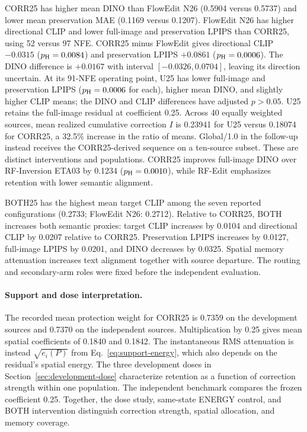 CORR25 has higher mean DINO than FlowEdit N26 (0.5904 versus 0.5737) and lower mean preservation MAE (0.1169 versus 0.1207). FlowEdit N26 has higher directional CLIP and lower full-image and preservation LPIPS than CORR25, using 52 versus 97 NFE. CORR25 minus FlowEdit gives directional CLIP $-0.0315$ ($p_{\rm H}=0.0084$) and preservation LPIPS $+0.0861$ ($p_{\rm H}=0.0006$). The DINO difference is $+0.0167$ with interval $[-0.0326,0.0704]$, leaving its direction uncertain. At its 91-NFE operating point, U25 has lower full-image and preservation LPIPS ($p_{\rm H}=0.0006$ for each), higher mean DINO, and slightly higher CLIP means; the DINO and CLIP differences have adjusted $p>0.05$. U25 retains the full-image residual at coefficient 0.25. Across 40 equally weighted sources, mean realized cumulative correction $I$ is 0.23941 for U25 versus 0.18074 for CORR25, a 32.5\% increase in the ratio of means. Global/1.0 in the follow-up instead receives the CORR25-derived sequence on a ten-source subset. These are distinct interventions and populations. CORR25 improves full-image DINO over RF-Inversion ETA03 by 0.1234 ($p_{\rm H}=0.0010$), while RF-Edit emphasizes retention with lower semantic alignment.

BOTH25 has the highest mean target CLIP among the seven reported configurations (0.2733; FlowEdit N26: 0.2712). Relative to CORR25, BOTH increases both semantic proxies: target CLIP increases by 0.0104 and directional CLIP by 0.0207 relative to CORR25. Preservation LPIPS increases by 0.0127, full-image LPIPS by 0.0201, and DINO decreases by 0.0325. Spatial memory attenuation increases text alignment together with source departure. The routing and secondary-arm roles were fixed before the independent evaluation.

\paragraph{Support and dose interpretation.}
The recorded mean protection weight for CORR25 is 0.7359 on the development sources and 0.7370 on the independent sources. Multiplication by 0.25 gives mean spatial coefficients of 0.1840 and 0.1842. The instantaneous RMS attenuation is instead $\sqrt{e_i(P)}$ from Eq.~\eqref{eq:support-energy}, which also depends on the residual's spatial energy. The three development doses in Section~\ref{sec:development-dose} characterize retention as a function of correction strength within one population. The independent benchmark compares the frozen coefficient 0.25. Together, the dose study, same-state ENERGY control, and BOTH intervention distinguish correction strength, spatial allocation, and memory coverage.

